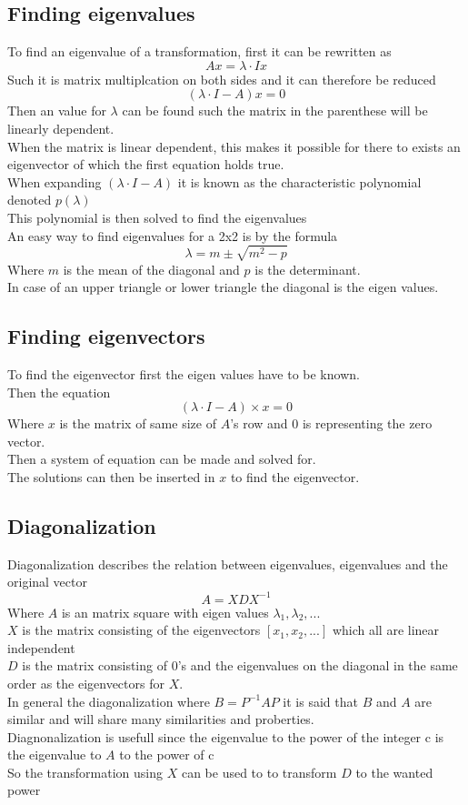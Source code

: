 \documentclass[12pt, a4paper]{article}
\begin{document}
		\subsection{Finding eigenvalues}
			To find an eigenvalue of a transformation, first it can be rewritten as
			$$Ax=\lambda\cdot I x$$
			Such it is matrix multiplcation on both sides and it can therefore be reduced
			$$(\lambda \cdot I-A)x=0$$
			Then an value for $\lambda$ can be found such the matrix in the parenthese will be linearly dependent.\\
			When the matrix is linear dependent, this makes it possible for there to exists an eigenvector of which the first equation holds true.\\
			When expanding $(\lambda\cdot I-A)$ it is known as the characteristic polynomial denoted $p(\lambda)$\\
			This polynomial is then solved to find the eigenvalues\\[4mm]
			An easy way to find eigenvalues for a 2x2 is by the formula
			$$\lambda=m\pm\sqrt{m^2-p}$$
			Where $m$ is the mean of the diagonal and $p$ is the determinant.\\[4mm]
			In case of an upper triangle or lower triangle the diagonal is the eigen values.\\
		\subsection{Finding eigenvectors}
			To find the eigenvector first the eigen values have to be known.\\
			Then the equation
			$$(\lambda\cdot I-A)\times x=0$$
			Where $x$ is the matrix of same size of $A$'s row and 0 is representing the zero vector.\\
			Then a system of equation can be made and solved for. \\
			The solutions can then be inserted in $x$ to find the eigenvector.
		\subsection{Diagonalization}
			Diagonalization describes the relation between eigenvalues, eigenvalues and the original vector
			$$A=XDX^{-1}$$
			Where $A$ is an matrix square with eigen values $\lambda_1,\lambda_2,...$\\
			$X$ is the matrix consisting of the eigenvectors $[x_1,x_2,...]$ which all are linear independent\\
			$D$ is the matrix consisting of 0's and the eigenvalues on the diagonal in the same order as the eigenvectors for $X$.\\[4mm]
			In general the diagonalization where $B=P^{-1}AP$ it is said that $B$ and $A$ are similar and will share many similarities and proberties.\\
			Diagnonalization is usefull since the eigenvalue to the power of the integer c is the eigenvalue to $A$ to the power of c\\
			So the transformation using $X$ can be used to to transform $D$ to the wanted power
\end{document}
